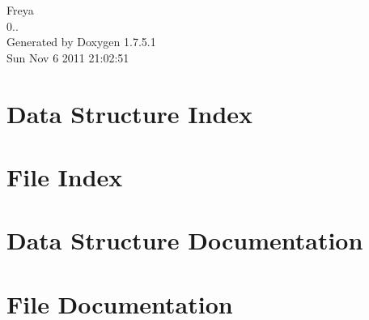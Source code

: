 \documentclass[a4paper]{book}
\begin{document}
\hypersetup{pageanchor=false,citecolor=blue}
\begin{titlepage}
\vspace*{7cm}
\begin{center}
{\Large \-Freya \\[1ex]\large 0.. }\\
\vspace*{1cm}
{\large \-Generated by Doxygen 1.7.5.1}\\
\vspace*{0.5cm}
{\small Sun Nov 6 2011 21:02:51}\\
\end{center}
\end{titlepage}
\clearemptydoublepage
{}
\tableofcontents
\clearemptydoublepage
{}
\hypersetup{pageanchor=true,citecolor=blue}
\chapter{\-Data \-Structure \-Index}

\chapter{\-File \-Index}

\chapter{\-Data \-Structure \-Documentation}














\chapter{\-File \-Documentation}























\printindex
\end{document}
